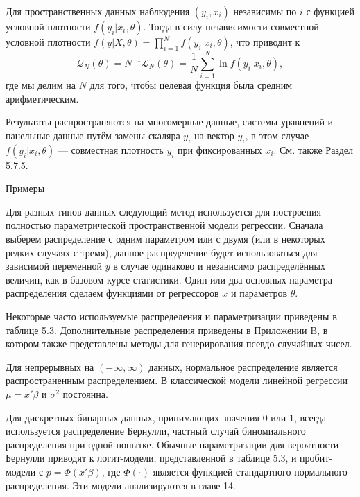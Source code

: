 \vspace{3cm}

Для пространственных данных наблюдения $(y_i,x_i)$ независимы по $i$ с функцией условной плотности $f(y_i|x_i,\theta)$. Тогда в силу независимости совместной условной плотности $f(y|X,\theta)=\prod_{i=1}^{N}f(y_i|x_i,\theta)$, что приводит к 
\begin{equation}
\mathcal{Q}_{N}(\theta)=N^{-1}\mathcal{L}_{N}(\theta)=\frac{1}{N} \sum_{i=1}^N \ln f(y_i|x_i,\theta),
\end{equation}
где мы делим на $N$ для того, чтобы целевая функция была средним арифметическим.

Результаты распространяются на многомерные данные, системы уравнений и панельные данные путём замены скаляра $y_i$ на вектор $y_i$, в этом случае $f(y_i|x_i,\theta)$ --- совместная плотность $y_i$
при фиксированных $x_i$. См. также Раздел 5.7.5.

\begin{center}
Примеры
\end{center}

Для разных типов данных следующий метод используется для построения полностью параметрической пространственной модели регрессии. Сначала выберем распределение с одним параметром или с двумя (или в некоторых редких случаях с тремя), данное распределение будет использоваться для зависимой переменной $y$ в случае одинаково и независимо распределённых величин, как в базовом курсе статистики. Один или два основных параметра распределения сделаем функциями от  регрессоров $x$ и параметров $\theta$.

Некоторые часто используемые распределения и параметризации приведены в таблице 5.3. Дополнительные распределения приведены в Приложении B, в котором также представлены методы для генерирования псевдо-случайных чисел.

Для непрерывных на $(-\infty,\infty)$ данных, нормальное распределение является распространенным распределением. В классической модели линейной регрессии $\mu=x'\beta$ и $\sigma^2$ постоянна.

Для дискретных бинарных данных, принимающих значения $0$ или $1$, всегда используется распределение Бернулли, частный случай биномиального распределения при одной попытке. Обычные параметризации для вероятности Бернулли приводят к логит-модели, представленной в таблице 5.3, и пробит-модели с  $p=\Phi(x'\beta)$, где $\Phi(\cdot)$ является  функцией стандартного нормального распределения. Эти модели анализируются в главе 14.

